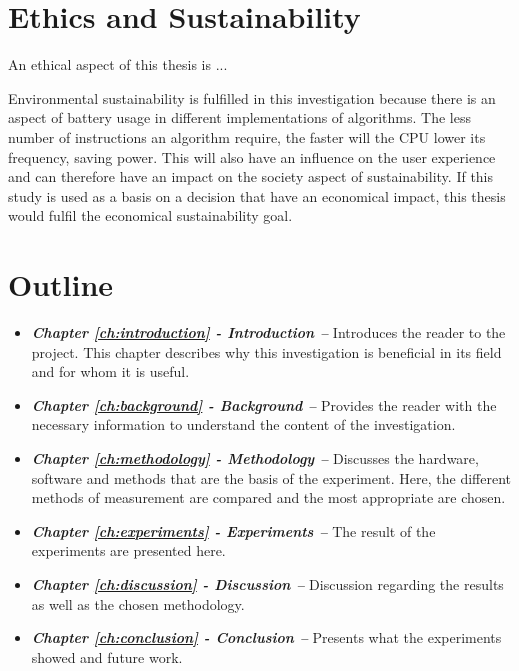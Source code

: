 \section{Ethics and Sustainability}
An ethical aspect of this thesis is ...

Environmental sustainability is fulfilled in this investigation because there is an aspect of battery usage in different implementations of algorithms. The less number of instructions an algorithm require, the faster will the CPU lower its frequency, saving power. This will also have an influence on the user experience and can therefore have an impact on the society aspect of sustainability. If this study is used as a basis on a decision that have an economical impact, this thesis would fulfil the economical sustainability goal.

\section{Outline}
\begin{itemize}
    \item \textit{\textbf{Chapter \ref{ch:introduction} - Introduction --}} Introduces the reader to the project. This chapter describes why this investigation is beneficial in its field and for whom it is useful.
    \item \textit{\textbf{Chapter \ref{ch:background} - Background --}} Provides the reader with the necessary information to understand the content of the investigation.
    \item \textit{\textbf{Chapter \ref{ch:methodology} - Methodology --}} Discusses the hardware, software and methods that are the basis of the experiment. Here, the different methods of measurement are compared and the most appropriate are chosen.
    \item \textit{\textbf{Chapter \ref{ch:experiments} - Experiments --}} The result of the experiments are presented here.
    \item \textit{\textbf{Chapter \ref{ch:discussion} - Discussion --}} Discussion regarding the results as well as the chosen methodology.
    \item \textit{\textbf{Chapter \ref{ch:conclusion} - Conclusion --}} Presents what the experiments showed and future work.
\end{itemize}
